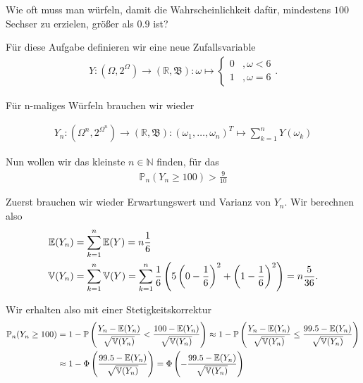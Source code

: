 \begin{exercise}

Wie oft muss man würfeln, damit die Wahrscheinlichkeit dafür, mindestens $100$ Sechser zu erzielen, größer als $0.9$ ist?

\end{exercise}

\begin{solution}

Für diese Aufgabe definieren wir eine neue Zufallsvariable
\begin{align*}
    Y:(\Omega,2^\Omega) \to (\mathbb{R},\mathfrak{B}): \omega \mapsto 
    \begin{cases}
        0 &, \omega < 6 \\
        1 &, \omega = 6
    \end{cases}.
\end{align*}

Für n-maliges Würfeln brauchen wir wieder

\begin{align*}
    Y_n:(\Omega^n,2^{\Omega^n}) \to (\mathbb{R}, \mathfrak{B}): (\omega_1,\dots,\omega_n)^T \mapsto \sum_{k=1}^n Y(\omega_k)
\end{align*}

Nun wollen wir das kleinste $n\in\mathbb{N}$ finden, für das 
\begin{align*}
    \mathbb{P}_n(Y_n \geq 100) > \frac{9}{10}
\end{align*}

Zuerst brauchen wir wieder Erwartungswert und Varianz von $Y_n$. Wir berechnen also
\begin{align*}
    \mathbb{E}(Y_n) &= \sum_{k=1}^n\mathbb{E}(Y) = n\frac{1}{6} \\
    \mathbb{V}(Y_n) &= \sum_{k=1}^n\mathbb{V}(Y) = \sum_{k=1}^n \frac{1}{6}\left ( 5\left ( 0-\frac{1}{6} \right )^2 + \left ( 1-\frac{1}{6} \right )^2 \right ) = n\frac{5}{36}.
\end{align*}

Wir erhalten also mit einer Stetigkeitskorrektur
\begin{align*}
    \mathbb{P}_n(Y_n \geq 100) &= 1 - \mathbb{P}\left ( \frac{Y_n-\mathbb{E}(Y_n)}{\sqrt{\mathbb{V}(Y_n)}} < \frac{100-\mathbb{E}(Y_n)}{\sqrt{\mathbb{V}(Y_n)}} \right ) \approx 1 - \mathbb{P}\left ( \frac{Y_n-\mathbb{E}(Y_n)}{\sqrt{\mathbb{V}(Y_n)}} \leq \frac{99.5-\mathbb{E}(Y_n)}{\sqrt{\mathbb{V}(Y_n)}} \right ) \\
    &\approx 1 - \Phi\left ( \frac{99.5-\mathbb{E}(Y_n)}{\sqrt{\mathbb{V}(Y_n)}} \right ) = \Phi\left ( -\frac{99.5-\mathbb{E}(Y_n)}{\sqrt{\mathbb{V}(Y_n)}} \right )
\end{align*}


\end{solution}
